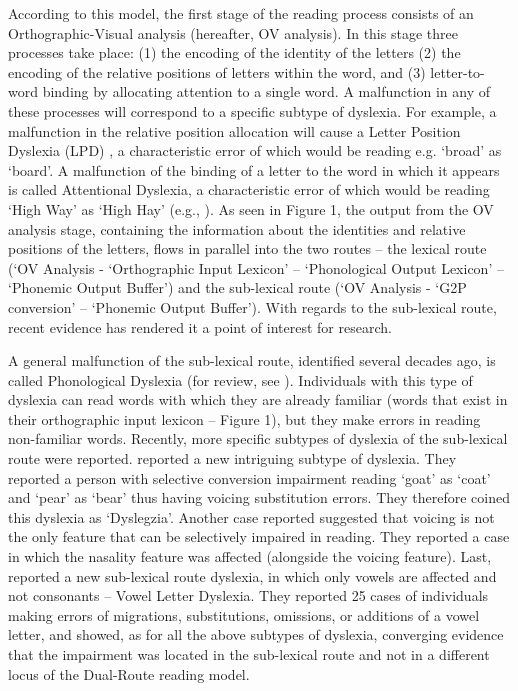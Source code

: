 According to this model, the first stage of the reading process consists of an Orthographic-Visual analysis (hereafter, OV analysis). In this stage three processes take place: (1) the encoding of the identity of the letters (2) the encoding of the relative positions of letters within the word, and (3) letter-to-word binding by allocating attention to a single word. A malfunction in any of these processes will correspond to a specific subtype of dyslexia. For example, a malfunction in the relative position allocation will cause a Letter Position Dyslexia (LPD) \citep{friedmann2001letter, friedmann2005letter}, a characteristic error of which would be reading e.g. ‘broad’ as ‘board’. A malfunction of the binding of a letter to the word in which it appears is called Attentional Dyslexia, a characteristic error of which would be reading ‘High Way’ as ‘High Hay’ (e.g., \citealp{sw77}). As seen in Figure 1, the output from the OV analysis stage, containing the information about the identities and relative positions of the letters, flows in parallel into the two routes – the lexical route (‘OV Analysis - ‘Orthographic Input Lexicon’ – ‘Phonological Output Lexicon’ – ‘Phonemic Output Buffer’) and the sub-lexical route (‘OV Analysis - ‘G2P conversion’ – ‘Phonemic Output Buffer’). With regards to the sub-lexical route, recent evidence has rendered it a point of interest for research. 

A general malfunction of the sub-lexical route, identified several decades ago, is called Phonological Dyslexia (for review, see \citealp{c96}). Individuals with this type of dyslexia can read words with which they are already familiar (words that exist in their orthographic input lexicon – Figure 1), but they make errors in reading non-familiar words. Recently, more specific subtypes of dyslexia of the sub-lexical route were reported. \citet{Gvion2010} reported a new intriguing subtype of dyslexia. They reported a person with selective conversion impairment reading ‘goat’ as ‘coat’ and ‘pear’ as ‘bear’ thus having voicing substitution errors. They therefore coined this dyslexia as ‘Dyslegzia’. Another case \citet{Gvion2012} reported suggested that voicing is not the only feature that can be selectively impaired in reading. They reported a case in which the nasality feature was affected (alongside the voicing feature). Last, \citet{kf11} reported a new sub-lexical route dyslexia, in which only vowels are affected and not consonants – Vowel Letter Dyslexia. They reported 25 cases of individuals making errors of migrations, substitutions, omissions, or additions of a vowel letter, and showed, as for all the above subtypes of dyslexia, converging evidence that the impairment was located in the sub-lexical route and not in a different locus of the Dual-Route reading model.

